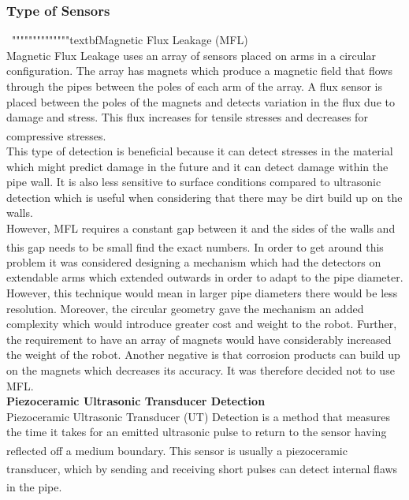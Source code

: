 \documentclass[11pt]{article}		%
\newcommand{\supercite}[1]{\textsuperscript{\cite{#1}}}		%
\begin{document}
	        \subsubsection{Type of Sensors}
	        \
	        """"""""""""""textbf{Magnetic Flux Leakage (MFL)}
	        \\
	        Magnetic Flux Leakage uses an array of sensors placed on arms in a circular configuration. 
	        The array has magnets which produce a magnetic field that flows through the pipes between the poles of each arm of the array.
	        A flux sensor is placed between the poles of the magnets and detects variation in the flux due to damage and stress.
	        This flux increases for tensile stresses and decreases for compressive stresses.\supercite{MFL_explanation}
	        \\
	        This type of detection is beneficial because it can detect stresses in the material which might predict damage in the future and it can detect damage within the pipe wall.
	        It is also less sensitive to surface conditions compared to ultrasonic detection which is useful when considering that there may be dirt build up on the walls.
	        \\
	        However, MFL requires a constant gap between it and the sides of the walls and this gap needs to be small find the exact numbers.\supercite{MFL_explanation} 
	        In order to get around this problem it was considered designing a mechanism which had the detectors on extendable arms which extended outwards in order to adapt to the pipe diameter. 
	        However, this technique would mean in larger pipe diameters there would be less resolution. 
	        Moreover, the circular geometry gave the mechanism an added complexity which would introduce greater cost and weight to the robot. 
	        Further, the requirement to have an array of magnets would have considerably increased the weight of the robot. %
	        Another negative is that corrosion products can build up on the magnets which decreases its accuracy. It was therefore decided not to use MFL.
	        \\
	        \textbf{Piezoceramic Ultrasonic Transducer Detection}
	        \\
	        Piezoceramic Ultrasonic Transducer (UT) Detection is a method that measures the time it takes for an emitted ultrasonic pulse to return to the sensor having reflected off a medium boundary.\supercite{UT_explanation}
	        This sensor is usually a piezoceramic transducer\supercite{UT}, which by sending and receiving short pulses can detect internal flaws in the pipe.\supercite{Corrosion}
\end{document}
